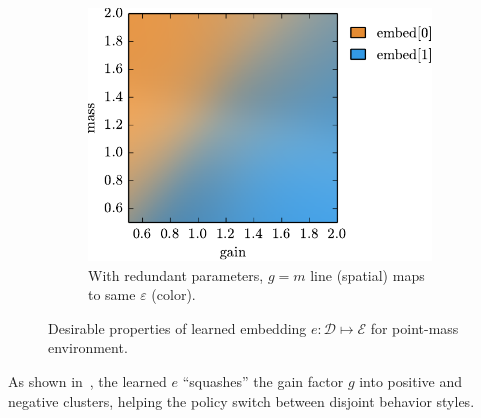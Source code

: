 \documentclass{article}
\newcommand{\plain}{\emph{plain}}
\newcommand{\embed}{\emph{ours}}
\newcommand{\embedfn}{e}
\newcommand{\idfn}{id}
\newcommand{\idset}{\mathcal{D}}
\newcommand{\latset}{\mathcal{E}}
\newcommand{\latvar}{\varepsilon}
\begin{document}
\begin{figure}
\begin{subfigure}[b]{0.23\textwidth}
\includegraphics[trim={0 0 2.5cm 0}, clip, width=\textwidth]{embed_colors.pdf}
        \caption{
With redundant parameters,
$g=m$ line (spatial) maps to same $\latvar$ (color).
}
        \label{fig:embed_colors}
    \end{subfigure}
    \caption{
    Desirable properties of learned embedding $\embedfn : \idset \mapsto \latset$ for point-mass environment.
    }
\vspace{-0.4cm}
\end{figure}
%

%
As shown in~,
the learned $\embedfn$ ``squashes'' the gain factor $g$ into positive and negative clusters,
helping the policy switch between disjoint behavior styles.
\end{document}

